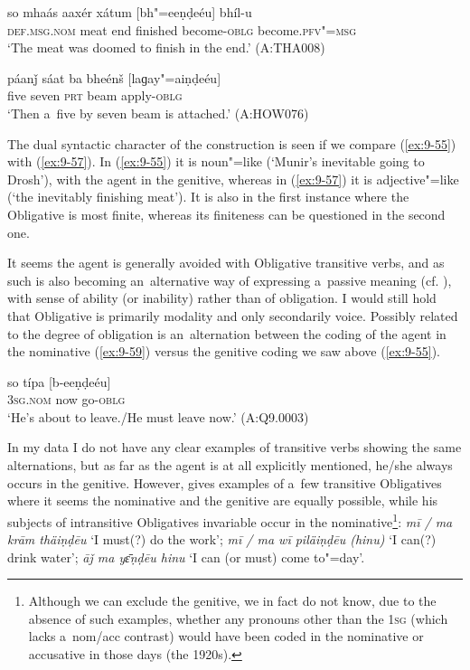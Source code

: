 \begin{exe}
\ex
\label{ex:9-57}
\gll so mhaás aaxér xátum [bh"=eeṇḍeéu] bhíl-u \\
\textsc{def.msg.nom} meat end finished become-\textsc{oblg} become.\textsc{pfv"=msg}  \\
\glt `The meat was doomed to finish in the end.' (A:THA008)

\ex
\label{ex:9-58}
\gll páanǰ sáat ba bheénš [laɡay"=aiṇḍeéu] \\
five seven \textsc{prt} beam apply-\textsc{oblg} \\
\glt `Then a~five by seven beam is attached.' (A:HOW076)
\end{exe}

The dual syntactic character of the construction is seen if we compare (\ref{ex:9-55}) with (\ref{ex:9-57}). In (\ref{ex:9-55}) it is noun"=like (`Munir's inevitable going to Drosh'), with the agent in the genitive, whereas in (\ref{ex:9-57}) it is adjective"=like (`the inevitably finishing meat'). It is also in the first instance where the Obligative is most finite, whereas its finiteness can be questioned in the second one.


It seems the agent is generally avoided with Obligative transitive verbs, and as such is also becoming an~alternative way of expressing a~passive meaning (cf. ), with sense of ability (or inability) rather than of obligation. I would still hold that Obligative is primarily modality and only secondarily voice. Possibly related to the degree of obligation is an~alternation between the coding of the agent in the nominative (\ref{ex:9-59}) versus the genitive coding we saw above (\ref{ex:9-55}).

\begin{exe}
\ex
\label{ex:9-59}
\gll so típa [b-eeṇḍeéu] \\
\textsc{3sg.nom} now go-\textsc{oblg} \\
\glt `He's about to leave./He must leave now.' (A:Q9.0003)
\end{exe}

In my data I do not have any clear examples of transitive verbs showing the same alternations, but as far as the agent is at all explicitly mentioned, he/she always occurs in the genitive. However, \citet[24]{morgenstierne1941} gives examples of a~few transitive Obligatives where it seems the nominative and the genitive are equally possible, while his subjects of intransitive Obligatives invariable occur in the nominative\footnote{Although we can exclude the genitive, we in fact do not know, due to the absence of such examples, whether any pronouns other than the \textsc{1sg} (which lacks a~nom/acc contrast) would have been coded in the nominative or accusative in those days (the 1920s).}: \textit{mī / ma krām thäiṇḍēu} `I must(?) do the work'; \textit{mī / ma wī piläiṇḍēu (hinu)} `I can(?) drink water'; \textit{āǰ ma yɛ̄ṇḍēu hinu} `I can (or must) come to"=day'.


